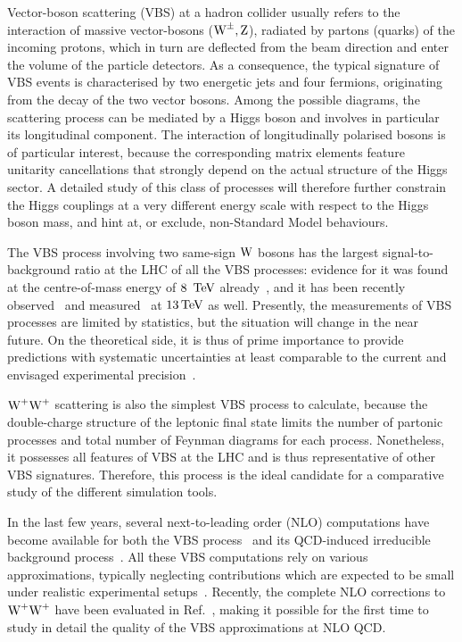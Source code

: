 Vector-boson scattering (VBS) at a hadron collider 
usually refers to the interaction of massive vector-bosons ($\text{W}^\pm,\text{Z}$),
radiated by partons (quarks) of the incoming protons, 
which in turn are deflected from the beam direction 
and enter the volume of the particle detectors.
As a consequence, the typical signature of VBS events
is characterised by two energetic jets 
and four fermions,
originating from the decay of the two vector bosons.
Among the possible diagrams,
the scattering process can be mediated by a Higgs boson
and involves in particular its longitudinal component.
The interaction of longitudinally polarised bosons is of particular interest, 
because the corresponding matrix elements feature unitarity cancellations 
that strongly depend on the actual structure of the Higgs sector.
A detailed study of this class of processes will therefore further constrain the Higgs couplings 
at a very different energy scale with respect to the Higgs boson mass,
and hint at, or exclude, non-Standard Model behaviours.

The VBS process involving two same-sign $\text{W}$ bosons has the largest signal-to-background ratio at the LHC of all the VBS processes:
evidence for it was found at the centre-of-mass energy of $8~\,\text{TeV}$ already~\cite{Aad:2014zda,Khachatryan:2014sta},
and it has been recently observed~\cite{Sirunyan:2017ret} and measured~\cite{Aaboud:2016ffv} 
at $13\,\text{TeV}$ as well.
Presently, the measurements of VBS processes are limited by statistics, but the situation will change in the near future.
On the theoretical side, 
it is thus of prime importance to provide predictions with systematic uncertainties
at least comparable to the current and envisaged experimental precision~\cite{CMS:2016rcn}.


$\text{W}^+\text{W}^+$ scattering is also the simplest VBS process to calculate, 
because the double-charge structure of the leptonic final state 
limits the number of partonic processes and total number of Feynman diagrams for each process.
Nonetheless, it possesses all features of VBS at the LHC and is thus representative of other VBS signatures.
Therefore, this process is the ideal candidate for a comparative study of the different simulation tools.

In the last few years, several next-to-leading order (NLO) computations have become available for both the VBS process~\cite{Jager:2006zc,Jager:2006cp,Bozzi:2007ur,Jager:2009xx,Jager:2011ms,Denner:2012dz,Rauch:2016pai} and its QCD-induced irreducible background process~\cite{Rauch:2016pai,Melia:2010bm,Melia:2011gk,Campanario:2013gea,Baglio:2014uba}.
All these VBS computations rely on various approximations, typically neglecting contributions which are expected to be small under realistic experimental setups~\cite{Denner:2012dz,Oleari:2003tc}.
Recently, the complete NLO corrections to $\text{W}^+\text{W}^+$ have been evaluated in Ref.~\cite{Biedermann:2017bss}, making it possible for the first time to study in detail the quality of the VBS approximations at NLO QCD.

